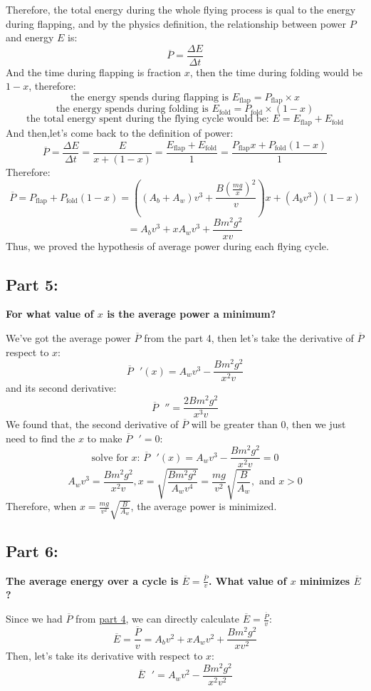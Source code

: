 \documentclass{article}
\begin{document}
Therefore, the total energy during the whole flying process is qual to the energy during flapping, and by the physics definition, the relationship between power \(P\) and energy \(E\) is:
\[\overline{P}=\frac{\Delta E}{\Delta t}\]
And the time during flapping is fraction \(x\), then the time during folding would be \(1-x\), therefore:
\[\text{the energy spends during flapping is } E_\text{flap} =P_\text{flap}\times  x \]
\[\text{the energy spends during folding is } E_\text{fold} = P_\text{fold}\times (1-x)\] 
\[\text{the total energy spent during the flying cycle would be: }E = E_\text{flap} +E_\text{fold} \]
And then,let's come back to the definition of power:
 \[\overline{P}=\frac{\Delta E}{\Delta t}=\frac{E}{x+(1-x)}=\frac{E_\text{flap}+E_\text{fold}}{1}=\frac{P_\text{flap}x + P_\text{fold}(1-x)}{1}\]
 Therefore:
\[\overline{P}=P_\text{flap}+P_\text{fold}(1-x)=((A_b+A_w)v^3+\frac{B(\frac{mg}{x})^2}{v})x+(A_bv^3)(1-x)\] 
\[= A_bv^3+xA_wv^3+\frac{Bm^2g^2}{xv}\]
Thus, we proved the hypothesis of average power during each flying cycle.


\subsection*{Part 5:}
{\large \bfseries For what value of \(x\) is the average power a minimum?
}\setlength{\parskip}{1em}

We've got the average power \(\overline{P}\) from the part 4, then let's take the derivative of \(\overline{P}\) respect to \(x\):
\[\overline{P}\text{ }'(x)= A_wv^3-\frac{Bm^2g^2}{x^2v}\]
and its second derivative:
\[\overline{P}\text{ }'' = \frac{2Bm^2g^2}{x^3v}\]
We found that, the second derivative of \(\overline{P}\) will be greater than \(0\), then we just need to find the \(x\) to make  \(\overline{P}\text{ }' = 0\):
\[\text{solve for }x \text{: }\overline{P}\text{ }'(x)= A_wv^3-\frac{Bm^2g^2}{x^2v} =0 \]
\[A_wv^3 = \frac{Bm^2g^2}{x^2v}, x = \sqrt{\frac{Bm^2g^2}{A_wv^4}} = \frac{mg}{v^2}\sqrt{\frac{B}{A_w}},\text{ and }x > 0\]
Therefore, when \(x = \frac{mg}{v^2}\sqrt{\frac{B}{A_w}}\), the average power is minimized.

\subsection*{Part 6:}
{\large \bfseries The average energy over a cycle is \(\overline{E} = \frac{\overline{P}}{v}\). What value of \(x\) minimizes \(\overline{E}\) ?}

Since we had \(\overline{P}\) from \hyperref[sec:part4]{part 4}, we can directly calculate \(\overline{E} = \frac{\overline{P}}{v}\):
\[\overline{E} = \frac{\overline{P}}{v}=  A_bv^2+xA_wv^2 + \frac{Bm^2g^2}{xv^2} \]
Then, let's take its derivative with respect to \(x\):
\[\overline{E}\text{ }' = A_wv^2-\frac{Bm^2g^2}{x^2v^2}\]
\end{document}
